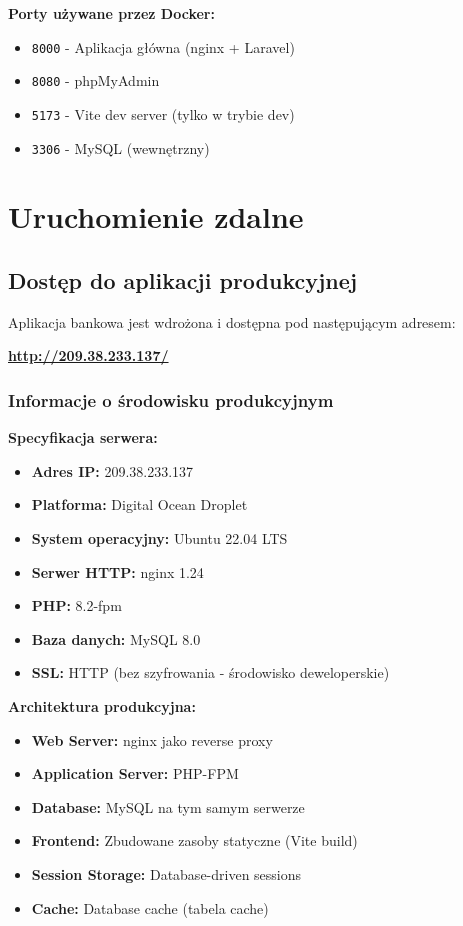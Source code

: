 \documentclass[12pt,a4paper]{article}
\begin{document}
    \textbf{Porty używane przez Docker:}
    \begin{itemize}
        \item \texttt{8000} - Aplikacja główna (nginx + Laravel)
        \item \texttt{8080} - phpMyAdmin
        \item \texttt{5173} - Vite dev server (tylko w trybie dev)
        \item \texttt{3306} - MySQL (wewnętrzny)
    \end{itemize}

    \section{Uruchomienie zdalne}

    \subsection{Dostęp do aplikacji produkcyjnej}

    Aplikacja bankowa jest wdrożona i dostępna pod następującym adresem:

    \begin{center}
        \textbf{\Large \url{http://209.38.233.137/}}
    \end{center}

    \subsubsection{Informacje o środowisku produkcyjnym}

    \textbf{Specyfikacja serwera:}
    \begin{itemize}
        \item \textbf{Adres IP:} 209.38.233.137
        \item \textbf{Platforma:} Digital Ocean Droplet
        \item \textbf{System operacyjny:} Ubuntu 22.04 LTS
        \item \textbf{Serwer HTTP:} nginx 1.24
        \item \textbf{PHP:} 8.2-fpm
        \item \textbf{Baza danych:} MySQL 8.0
        \item \textbf{SSL:} HTTP (bez szyfrowania - środowisko deweloperskie)
    \end{itemize}

    \textbf{Architektura produkcyjna:}
    \begin{itemize}
        \item \textbf{Web Server:} nginx jako reverse proxy
        \item \textbf{Application Server:} PHP-FPM
        \item \textbf{Database:} MySQL na tym samym serwerze
        \item \textbf{Frontend:} Zbudowane zasoby statyczne (Vite build)
        \item \textbf{Session Storage:} Database-driven sessions
        \item \textbf{Cache:} Database cache (tabela cache)
    \end{itemize}
\end{document}

